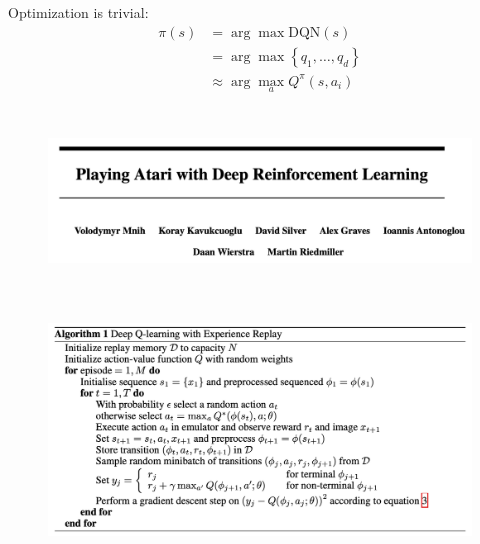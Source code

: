 \documentclass[
  letterpaper,
  DIV=11,
  numbers=noendperiod,
  oneside]{scrartcl}
\begin{document}
\subsection{}\label{section-12}

Optimization is trivial: \begin{align}
\pi(s) &= \arg\max \text{DQN}(s) \\
&= \arg\max\left\{ q_1, \ldots, q_d \right\} \\
&\approx \arg\max_{a} Q^\pi (s,a_i)
\end{align}

\subsection{}\label{section-13}

\begin{figure}

\begin{minipage}{\linewidth}
\begin{center}
\includegraphics[width=\textwidth,height=1.5625in]{figs/mnih_atari.png}
\end{center}
\end{minipage}%
\newline
\begin{minipage}{\linewidth}
\begin{center}
\includegraphics[width=\textwidth,height=3.125in]{figs/mnih_algo.png}
\end{center}
\end{minipage}%

\end{figure}%
\end{document}
